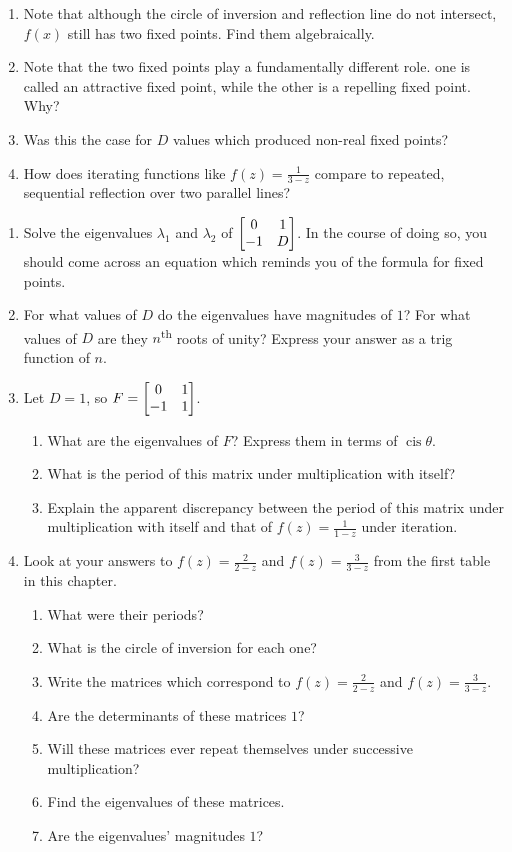 \documentclass[../gatm_answers.tex]{subfiles}
\begin{document}
\begin{enumerate}
\begin{enumerate}
\item Note that although the circle of inversion and reflection line do not intersect, $f(x)$ still has two fixed points. Find them algebraically.
\item Note that the two fixed points play a fundamentally different role. one is called an attractive fixed point, while the other is a repelling fixed point. Why?
\item Was this the case for $D$ values which produced non-real fixed points?
\item How does iterating functions like $f(z)=\frac{1}{3-z}$ compare to repeated, sequential reflection over two parallel lines?
\end{enumerate}
\setcounter{problem_i}{\value{enumi}}
\end{enumerate}

\begin{enumerate}
\setcounter{enumi}{\value{problem_i}}
\item Solve the eigenvalues $\lambda_1$ and $\lambda_2$ of $\begin{bmatrix} 0 & 1 \\ -1 & D \end{bmatrix}$. In the course of doing so, you should come across an equation which reminds you of the formula for fixed points.
\item For what values of $D$ do the eigenvalues have magnitudes of $1$? For what values of $D$ are they $n$\textsuperscript{th} roots of unity? Express your answer as a trig function of $n$.
\item Let $D=1$, so $F=\begin{bmatrix} 0 & 1 \\ -1 & 1 \end{bmatrix}$.
\begin{enumerate}
\item What are the eigenvalues of $F$? Express them in terms of $\operatorname{cis} \theta$.
\item What is the period of this matrix under multiplication with itself?
\item Explain the apparent discrepancy between the period of this matrix under multiplication with itself and that of $f(z)=\frac{1}{1-z}$ under iteration.
\end{enumerate}
\item Look at your answers to $f(z)=\frac{2}{2-z}$ and $f(z)=\frac{3}{3-z}$ from the first table in this chapter.
\begin{enumerate}
\item What were their periods?
\item What is the circle of inversion for each one?
\item Write the matrices which correspond to $f(z)=\frac{2}{2-z}$ and $f(z)=\frac{3}{3-z}$.
\item Are the determinants of these matrices $1$?
\item Will these matrices ever repeat themselves under successive multiplication?
\item Find the eigenvalues of these matrices.
\item Are the eigenvalues' magnitudes $1$?
\end{enumerate}
\end{enumerate}
\fi
\end{document}
